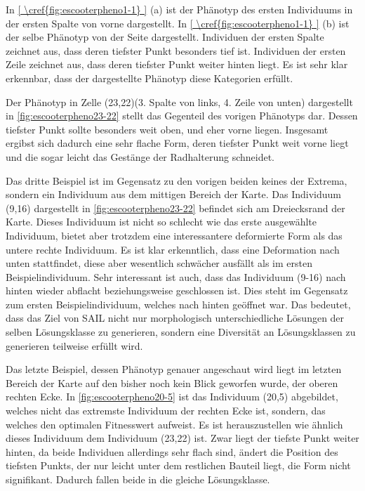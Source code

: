 \newcommand{\escref}[1]{
	\cref{fig:escooterpheno#1}
}


In \cref{\escref{1-1}} (a) ist der Phänotyp des ersten Individuums in der ersten Spalte von vorne dargestellt.
In \cref{\escref{1-1}} (b) ist der selbe Phänotyp von der Seite dargestellt.
Individuen der ersten Spalte zeichnet aus, dass deren tiefster Punkt besonders tief ist.
Individuen der ersten Zeile zeichnet aus, dass deren tiefster Punkt weiter hinten liegt.
Es ist sehr klar erkennbar, dass der dargestellte Phänotyp diese Kategorien erfüllt.



Der Phänotyp in Zelle (23,22)(3. Spalte von links, 4. Zeile von unten) dargestellt in \escref{23-22} stellt das Gegenteil des vorigen Phänotyps dar.
Dessen tiefster Punkt sollte besonders weit oben, und eher vorne liegen.
Insgesamt ergibst sich dadurch eine sehr flache Form, deren tiefster Punkt weit vorne liegt und die sogar leicht das Gestänge der Radhalterung schneidet.


Das dritte Beispiel ist im Gegensatz zu den vorigen beiden keines der Extrema, sondern ein Individuum aus dem mittigen Bereich der Karte.
Das Individuum (9,16) dargestellt in \escref{23-22} befindet sich am Dreiecksrand der Karte.
Dieses Individuum ist nicht so schlecht wie das erste ausgewählte Individuum, bietet aber trotzdem eine interessantere deformierte Form als das untere rechte Individuum.
Es ist klar erkenntlich, dass eine Deformation nach unten stattfindet, diese aber wesentlich schwächer ausfällt als im ersten Beispielindividuum.
Sehr interessant ist auch, dass das Individuum (9-16) nach hinten wieder abflacht beziehungsweise geschlossen ist.
Dies steht im Gegensatz zum ersten Beispielindividuum, welches nach hinten geöffnet war.
Das bedeutet, dass das Ziel von SAIL nicht nur morphologisch unterschiedliche Lösungen der selben Lösungsklasse zu generieren, sondern eine Diversität an Lösungsklassen zu generieren teilweise erfüllt wird.


Das letzte Beispiel, dessen Phänotyp genauer angeschaut wird liegt im letzten Bereich der Karte auf den bisher noch kein Blick geworfen wurde, der oberen rechten Ecke.
In \escref{20-5} ist das Individuum (20,5) abgebildet, welches nicht das extremste Individuum der rechten Ecke ist, sondern, das welches den optimalen Fitnesswert aufweist.
Es ist herauszustellen wie ähnlich dieses Individuum dem Individuum (23,22) ist.
Zwar liegt der tiefste Punkt weiter hinten, da beide Individuen allerdings sehr flach sind, ändert die Position des tiefsten Punkts, der nur leicht unter dem restlichen Bauteil liegt, die Form nicht signifikant.
Dadurch fallen beide in die gleiche Lösungsklasse.

